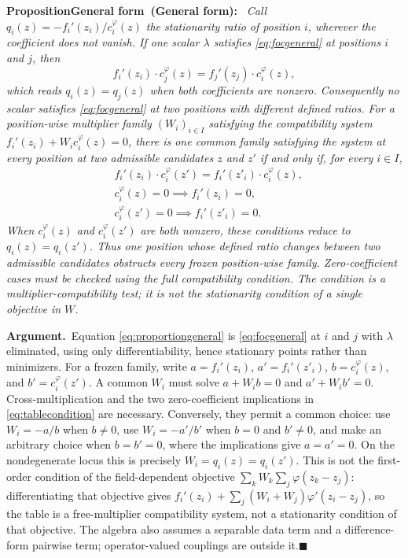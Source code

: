 \documentclass[twoside,11pt]{article}
\newenvironment{uprop}[1][]{\par\medskip\noindent\textbf{Proposition\ifx\relax#1\relax\else\ (#1)\fi:}\ \itshape}{\par\medskip} %
\newcommand{\argument}{\par\medskip\noindent\textbf{Argument.}\ }
\newcommand{\qedbox}{\hfill$\blacksquare$}
\begin{document}
\begin{uprop}[General form]
Call $q_i(z) = -f_i'(z_i)/c_i^{\varphi}(z)$ the \emph{stationarity ratio} of position $i$, wherever the coefficient does not vanish. If one scalar $\lambda$ satisfies \eqref{eq:focgeneral} at positions $i$ and $j$, then
\begin{equation}
f_i'(z_i) \cdot c_j^{\varphi}(z) = f_j'(z_j) \cdot c_i^{\varphi}(z),
\label{eq:proportiongeneral}%
\end{equation}%
which reads $q_i(z)=q_j(z)$ when both coefficients are nonzero. Consequently no scalar satisfies \eqref{eq:focgeneral} at two positions with different defined ratios. For a position-wise multiplier family $(W_i)_{i\in I}$ satisfying the compatibility system $f_i'(z_i)+W_i c_i^{\varphi}(z)=0$, there is one common family satisfying the system at every position at two admissible candidates $z$ and $z'$ if and only if, for every $i\in I$,
\begin{equation}
\begin{aligned}
& f_i'(z_i) \cdot c_i^{\varphi}(z') = f_i'(z'_i) \cdot c_i^{\varphi}(z), \\
& c_i^{\varphi}(z)=0 \implies f_i'(z_i)=0, \\
& c_i^{\varphi}(z')=0 \implies f_i'(z'_i)=0 .
\end{aligned}
\label{eq:tablecondition}%
\end{equation}%
When $c_i^{\varphi}(z)$ and $c_i^{\varphi}(z')$ are both nonzero, these conditions reduce to $q_i(z)=q_i(z')$. Thus one position whose defined ratio changes between two admissible candidates obstructs every frozen position-wise family. Zero-coefficient cases must be checked using the full compatibility condition. The condition is a multiplier-compatibility test; it is not the stationarity condition of a single objective in $W$.
\end{uprop}

\argument Equation \eqref{eq:proportiongeneral} is \eqref{eq:focgeneral} at $i$ and $j$ with $\lambda$ eliminated, using only differentiability, hence stationary points rather than minimizers. For a frozen family, write $a=f_i'(z_i)$, $a'=f_i'(z'_i)$, $b=c_i^{\varphi}(z)$, and $b'=c_i^{\varphi}(z')$. A common $W_i$ must solve $a+W_ib=0$ and $a'+W_ib'=0$. Cross-multiplication and the two zero-coefficient implications in \eqref{eq:tablecondition} are necessary. Conversely, they permit a common choice: use $W_i=-a/b$ when $b\neq0$, use $W_i=-a'/b'$ when $b=0$ and $b'\neq0$, and make an arbitrary choice when $b=b'=0$, where the implications give $a=a'=0$. On the nondegenerate locus this is precisely $W_i=q_i(z)=q_i(z')$. This is not the first-order condition of the field-dependent objective $\sum_k W_k\sum_j\varphi(z_k-z_j)$: differentiating that objective gives $f_i'(z_i)+\sum_j(W_i+W_j)\varphi'(z_i-z_j)$, so the table is a free-multiplier compatibility system, not a stationarity condition of that objective. The algebra also assumes a separable data term and a difference-form pairwise term; operator-valued couplings are outside it.\qedbox
\end{document}
